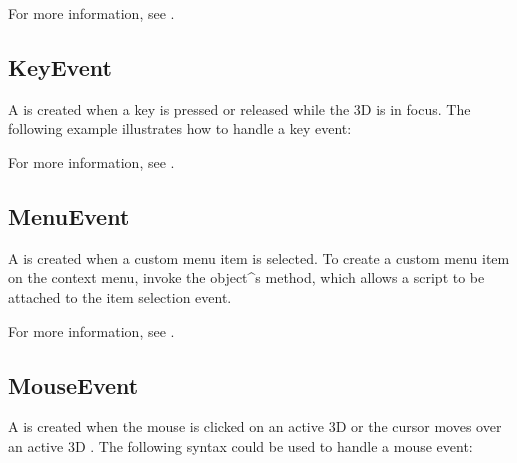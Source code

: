 \documentclass[letterpaper,12pt,english,openany,oneside]{sphinxmanual}
\begin{document}
For more information, see .


\subsection{KeyEvent}
\label{\detokenize{index:keyevent}}
A  is created when a key is pressed or released while the 3D  is in focus. The following example illustrates how to handle a key event:

\begin{sphinxVerbatim}[commandchars=\\\{\}]
            
      
         
   
\end{sphinxVerbatim}

For more information, see .


\subsection{MenuEvent}
\label{\detokenize{index:menuevent}}
A  is created when a custom menu item is selected. To create a custom menu item on the context menu, invoke the  object\textasciicircum{}s  method, which allows a script to be attached to the item selection event.

For more information, see .


\subsection{MouseEvent}
\label{\detokenize{index:mouseevent}}
A  is created when the mouse is clicked on an active 3D  or the cursor moves over an active 3D  . The following syntax could be used to handle a mouse event:
\end{document}
